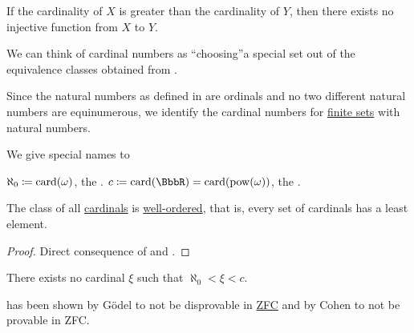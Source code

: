 \begin{corollary}\label{def:pigeonhole_principle}
  If the cardinality of \( X \) is greater than the cardinality of \( Y \), then there exists no injective function from \( X \) to \( Y \).
\end{corollary}

\begin{remark}\label{rem:cardinals}
  We can think of cardinal numbers as \enquote{choosing}\AOC a special set out of the equivalence classes obtained from .

  Since the natural numbers as defined in  are ordinals and no two different natural numbers are equinumerous, we identify the cardinal numbers for \hyperref[def:finite_set]{finite sets} with natural numbers.

  We give special names to
  \begin{RemEnum}
     \( \aleph_0 \coloneqq \operatorname{card}(\omega) \), the .
     \( c \coloneqq \Card(\BbbR) = \Card(\Pow(\omega)) \), the .
  \end{RemEnum}
\end{remark}

\begin{proposition}\label{thm:cardinals_well_ordered}
  The class of all \hyperref[def:cardinal]{cardinals} is \hyperref[def:well_ordered_set]{well-ordered}, that is, every set of cardinals has a least element.
\end{proposition}
\begin{proof}
  Direct consequence of  and .
\end{proof}

\begin{hypothesis}\label{hyp:continuum_hypothesis}
  There exists no cardinal \( \xi \) such that \( \aleph_0 < \xi < c \).
\end{hypothesis}

\begin{remark}\label{rem:continuum_hypothesis}
   has been shown by G\"odel to not be disprovable in \hyperref[def:set_zfc]{ZFC} and by Cohen to not be provable in ZFC.
\end{remark}

